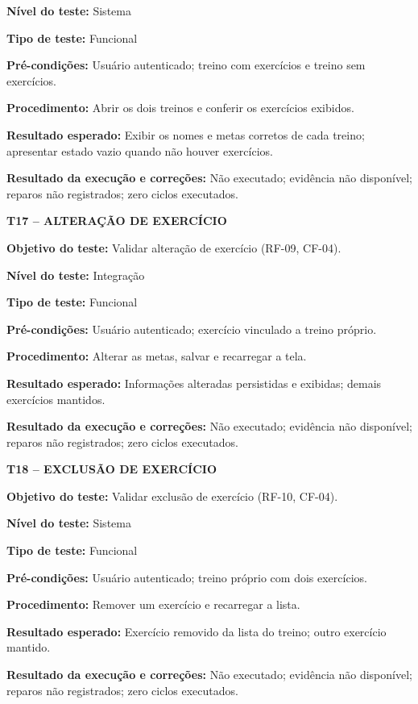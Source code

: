 \noindent\textbf{Nível do teste:} Sistema

\noindent\textbf{Tipo de teste:} Funcional

\noindent\textbf{Pré-condições:} Usuário autenticado; treino com exercícios e treino sem exercícios.

\noindent\textbf{Procedimento:} Abrir os dois treinos e conferir os exercícios exibidos.

\noindent\textbf{Resultado esperado:} Exibir os nomes e metas corretos de cada treino; apresentar estado vazio quando não houver exercícios.

\noindent\textbf{Resultado da execução e correções:} Não executado; evidência não disponível; reparos não registrados; zero ciclos executados.

\textbf{T17 -- ALTERAÇÃO DE EXERCÍCIO}

\noindent\textbf{Objetivo do teste:} Validar alteração de exercício (RF-09, CF-04).

\noindent\textbf{Nível do teste:} Integração

\noindent\textbf{Tipo de teste:} Funcional

\noindent\textbf{Pré-condições:} Usuário autenticado; exercício vinculado a treino próprio.

\noindent\textbf{Procedimento:} Alterar as metas, salvar e recarregar a tela.

\noindent\textbf{Resultado esperado:} Informações alteradas persistidas e exibidas; demais exercícios mantidos.

\noindent\textbf{Resultado da execução e correções:} Não executado; evidência não disponível; reparos não registrados; zero ciclos executados.

\textbf{T18 -- EXCLUSÃO DE EXERCÍCIO}

\noindent\textbf{Objetivo do teste:} Validar exclusão de exercício (RF-10, CF-04).

\noindent\textbf{Nível do teste:} Sistema

\noindent\textbf{Tipo de teste:} Funcional

\noindent\textbf{Pré-condições:} Usuário autenticado; treino próprio com dois exercícios.

\noindent\textbf{Procedimento:} Remover um exercício e recarregar a lista.

\noindent\textbf{Resultado esperado:} Exercício removido da lista do treino; outro exercício mantido.

\noindent\textbf{Resultado da execução e correções:} Não executado; evidência não disponível; reparos não registrados; zero ciclos executados.


